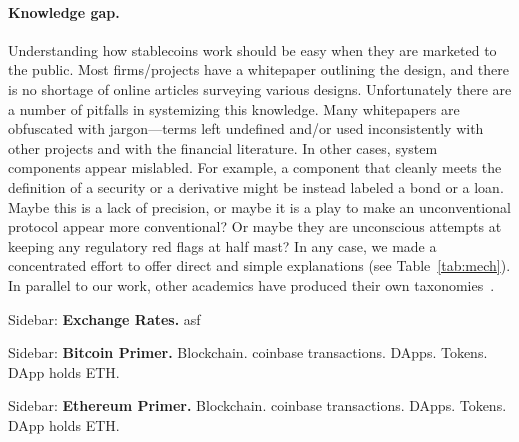 \paragraph{Knowledge gap.} Understanding how stablecoins work should be easy when they are marketed to the public. Most firms/projects have a whitepaper outlining the design, and there is no shortage of online articles surveying various designs. Unfortunately there are a number of pitfalls in systemizing this knowledge. Many whitepapers are obfuscated with jargon---terms left undefined and/or used inconsistently with other projects and with the financial literature. In other cases, system components appear mislabled. For example, a component that cleanly meets the definition of a security or a derivative might be instead labeled a bond or a loan. Maybe this is a lack of precision, or maybe it is a play to make an unconventional protocol appear more conventional? Or maybe they are unconscious attempts at keeping any regulatory red flags at half mast? In any case, we made a concentrated effort to offer direct and simple explanations (see Table~\ref{tab:mech}). In parallel to our work, other academics have produced their own taxonomies~\cite{PHP+19,MSS20}.
	
\begin{Sidebar*}[h!]
\begin{framed}
\begin{flushleft}
Sidebar: \textbf{Exchange Rates.}
asf
\end{flushleft}
\end{framed}
\end{Sidebar*}

\begin{Sidebar*}[h!]
\begin{framed}
\begin{flushleft}
Sidebar: \textbf{Bitcoin Primer.}
Blockchain. coinbase transactions. DApps. Tokens. DApp holds ETH. ~\cite{NaCl17}
\end{flushleft}
\end{framed}
\end{Sidebar*}

\begin{Sidebar*}[h!]
\begin{framed}
\begin{flushleft}
Sidebar: \textbf{Ethereum Primer.}
Blockchain. coinbase transactions. DApps. Tokens. DApp holds ETH. 
\end{flushleft}
\end{framed}
\end{Sidebar*}

